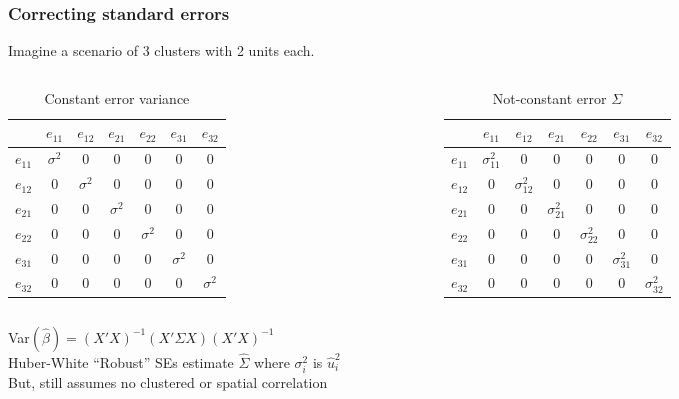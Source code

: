 \documentclass{beamer}
\begin{document}
\begin{frame}
\frametitle{Correcting standard errors}
Imagine a scenario of 3 clusters with 2 units each.
\begin{columns}[T] %
\begin{column}{.48\textwidth}
\begin{table}[h]
\caption{Constant error variance}
\resizebox{\linewidth} {\height}{%
    \setlength\tabcolsep{2pt}%
\begin{tabular}{ c|c c c c c c|}
 		 &  $e_{11}$ & $e_{12}$ & $e_{21}$ & $e_{22}$ & $e_{31}$ & $e_{32}$\\ \hline
$e_{11}$ & $\sigma^2$ & 0 	   & 0 		  & 0 		 & 0 		& 0 		\\
$e_{12}$ & 0  		 & $\sigma^2$ & 0 		  & 0 		 & 0 		& 0 		\\
$e_{21}$ & 0			 & 0 	   & $\sigma^2$ & 0 		 & 0 		& 0 		\\
$e_{22}$ & 0			 & 0 	   & 0 		  & $\sigma^2$ & 0 		& 0 		\\
$e_{31}$ & 0			 & 0 	   & 0 		  & 0 		 & $\sigma^2$ & 0 		\\
$e_{32}$ & 0			 & 0 	   & 0 		  & 0 		 & 0 		& $\sigma^2$ \\ \hline
\end{tabular}}
\end{table}
\end{column}%
\hfill%
\begin{column}{.48\textwidth}
\begin{table}[h]
\caption{Not-constant error $\Sigma$}
\resizebox{\linewidth} {\height}{%
    \setlength\tabcolsep{2pt}%
\begin{tabular}{ c|c c c c c c|}
 		 &  $e_{11}$ & $e_{12}$ & $e_{21}$ & $e_{22}$ & $e_{31}$ & $e_{32}$\\ \hline
$e_{11}$ & $\sigma_{11}^2$ & 0 	   & 0 		  & 0 		 & 0 		& 0 		\\
$e_{12}$ & 0  		 & $\sigma_{12}^2$ & 0 		  & 0 		 & 0 		& 0 		\\
$e_{21}$ & 0			 & 0 	   & $\sigma_{21}^2$ & 0 		 & 0 		& 0 		\\
$e_{22}$ & 0			 & 0 	   & 0 		  & $\sigma_{22}^2$ & 0 		& 0 		\\
$e_{31}$ & 0			 & 0 	   & 0 		  & 0 		 & $\sigma_{31}^2$ & 0 		\\
$e_{32}$ & 0			 & 0 	   & 0 		  & 0 		 & 0 		& $\sigma_{32}^2$ \\ \hline
\end{tabular}}
\end{table}
\end{column}%
\end{columns}
Var$(\hat{\beta})=(X'X)^{-1}(X' \Sigma X)(X'X)^{-1}$\\
Huber-White ``Robust'' SEs estimate $\hat{\Sigma}$ where $\sigma_i^2$ is $\hat{u}_i^2$ \\
But, still assumes no clustered or spatial correlation
\end{frame}
\end{document}

